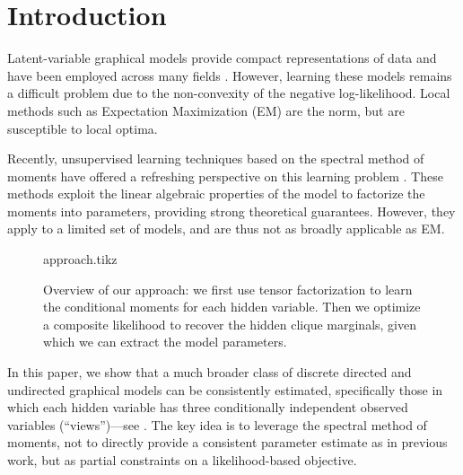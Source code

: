 \section{Introduction}
\label{sec:introduction}

Latent-variable graphical models provide compact representations of data
and have been employed across many fields %
\cite{ghahramani1999variational,jaakkola1999variational,blei03lda,quattoni04crf,beaumont2004bayesian,haghighi06prototype}.
However, learning these models remains a difficult problem due to the
non-convexity of the negative log-likelihood.  Local methods such as Expectation Maximization (EM)
are the norm, but are susceptible to local optima.

Recently, unsupervised learning techniques based on the spectral method of moments
have offered a refreshing perspective on
this learning problem
\citep{mossel2005learning,
hsu09spectral,
bailly2010spectral,
song2011spectral,
anandkumar11tree,anandkumar12moments,anandkumar12lda,
hsu12identifiability,
balle12automata}.
These methods exploit the linear algebraic properties of the model to
factorize the moments into parameters, providing strong theoretical guarantees.
However, they apply to a limited set of models, and are thus
not as broadly applicable as EM.

\begin{figure}[t]
  \label{fig:approach}
  \centering
  {approach.tikz}
  \caption{
  Overview of our approach: we first use tensor factorization to learn the conditional moments for each hidden variable.
  Then we optimize a composite likelihood to recover the hidden clique marginals,
  given which we can extract the model parameters.
  }
\end{figure}


In this paper,
we show that a much broader class of discrete directed and undirected graphical models can be consistently estimated,
specifically those in which each hidden variable has three conditionally
independent observed variables (``views'')---see .
The key idea is to leverage the spectral method of moments,
not to directly provide a consistent parameter estimate as in previous work,
but as partial constraints on a likelihood-based objective.

